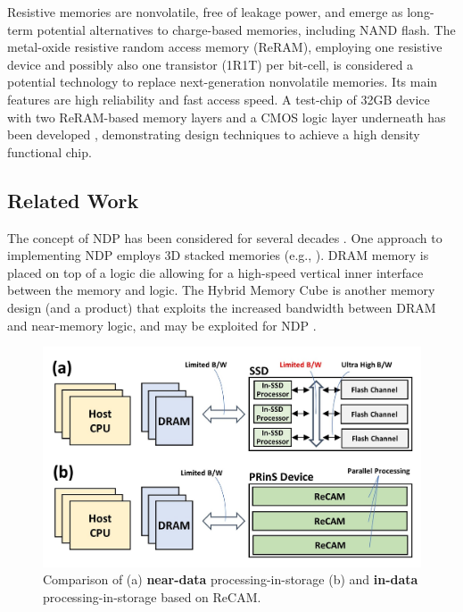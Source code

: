 \documentclass{superfri}
\begin{document}
Resistive memories are nonvolatile, free of leakage power, and emerge as long-term potential alternatives to charge-based memories, including NAND flash. The metal-oxide resistive random access memory (ReRAM), employing one resistive device and possibly also one transistor (1R1T) per bit-cell, is considered a potential technology to replace next-generation nonvolatile memories. Its main features are high reliability and fast access speed. A test-chip of 32GB device with two ReRAM-based memory layers and a CMOS logic layer underneath has been developed \cite{ahn2015pim}, demonstrating design techniques to achieve a high density functional chip. 

\subsection{Related Work}
\label{sec:related_work}
The concept of NDP has been considered for several decades \cite{kogge1999short}. One approach to implementing NDP employs 3D stacked memories (e.g., \cite{ahn2015scalable}\cite{giridhar2013exploring}). DRAM memory is placed on top of a logic die allowing for a high-speed vertical inner interface between the memory and logic. The Hybrid Memory Cube \cite{liu2014swaphi} is another memory design (and a product) that exploits the increased bandwidth between DRAM and near-memory logic, and may be exploited for NDP \cite{azarkhish2017logic}. 

\begin{figure}[h!]
	\centerline{\includegraphics{Figures/In_vs_near_data.jpg}}
	\caption{Comparison of (a) \textbf{near-data} processing-in-storage (b) and \textbf{in-data} processing-in-storage based on ReCAM.}
	\label{fig:in_vs_near_data}
\end{figure}
\end{document}
